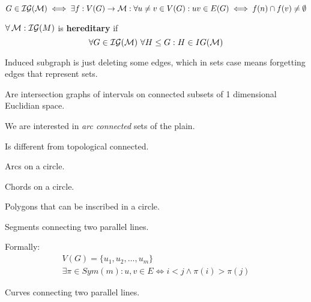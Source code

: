 \begin{observation}
	\[ G \in \operatorname{\mathcal{IG}}(\operatorname{\mathcal{M}}) \iff \exists f:V(G) \to \operatorname{\mathcal{M}}: \forall u \ne v \in V(G): uv \in E(G) \iff f(n) \cap f(v) \ne \emptyset \]
\end{observation}

\begin{observation}
	$\forall \operatorname{\mathcal{M}}: \operatorname{\mathcal{IG}}(M)$ is \textbf{hereditary} if
	\[ \forall G \in \operatorname{\mathcal{IG}}(\operatorname{\mathcal{M}}) \ \forall H \leq G: H \in IG(\operatorname{\mathcal{M}}) \]

	Induced subgraph is just deleting some edges, which in sets case means forgetting edges that represent sets.
\end{observation}

\begin{definition}
	Are intersection graphs of intervals on connected subsets of 1 dimensional Euclidian space.
\end{definition}

We are interested in \emph{arc connected} sets of the plain.
\begin{definition}

	Is different from topological connected.
\end{definition}

\begin{definition}
	Arcs on a circle.
\end{definition}

\begin{definition}
	Chords on a circle.
\end{definition}

\begin{definition}
	Polygons that can be inscribed in a circle.
\end{definition}

\begin{definition}
	Segments connecting two parallel lines.

	Formally:
	\begin{gather*}
		V(G) = \{ u_1, u_2, \ldots, u_m \} \\
		\exists \pi \in Sym(m): u,v \in E \iff i < j \land \pi(i) > \pi (j)
	\end{gather*}
\end{definition}

\begin{definition}
	Curves connecting two parallel lines.
\end{definition}

